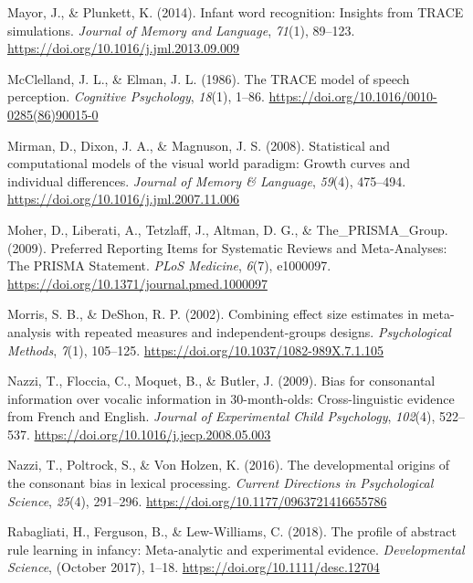 \documentclass[
  english,
  man, noextraspace]{apa6}
\newlength{\cslhangindent}
\newenvironment{cslreferences}%
  {\setlength{\parindent}{0pt}%
  \everypar{\setlength{\hangindent}{\cslhangindent}}\ignorespaces}%
  {\par}
\begin{document}
\begin{cslreferences}
\leavevmode\hypertarget{ref-Mayor2014}{}%
Mayor, J., \& Plunkett, K. (2014). Infant word recognition: Insights from TRACE simulations. \emph{Journal of Memory and Language}, \emph{71}(1), 89--123. \url{https://doi.org/10.1016/j.jml.2013.09.009}

\leavevmode\hypertarget{ref-McClelland1986}{}%
McClelland, J. L., \& Elman, J. L. (1986). The TRACE model of speech perception. \emph{Cognitive Psychology}, \emph{18}(1), 1--86. \url{https://doi.org/10.1016/0010-0285(86)90015-0}

\leavevmode\hypertarget{ref-Mirman2008}{}%
Mirman, D., Dixon, J. A., \& Magnuson, J. S. (2008). Statistical and computational models of the visual world paradigm: Growth curves and individual differences. \emph{Journal of Memory \& Language}, \emph{59}(4), 475--494. \url{https://doi.org/10.1016/j.jml.2007.11.006}

\leavevmode\hypertarget{ref-Moher2009}{}%
Moher, D., Liberati, A., Tetzlaff, J., Altman, D. G., \& The\_PRISMA\_Group. (2009). Preferred Reporting Items for Systematic Reviews and Meta-Analyses: The PRISMA Statement. \emph{PLoS Medicine}, \emph{6}(7), e1000097. \url{https://doi.org/10.1371/journal.pmed.1000097}

\leavevmode\hypertarget{ref-morris2002combining}{}%
Morris, S. B., \& DeShon, R. P. (2002). Combining effect size estimates in meta-analysis with repeated measures and independent-groups designs. \emph{Psychological Methods}, \emph{7}(1), 105--125. \url{https://doi.org/10.1037/1082-989X.7.1.105}

\leavevmode\hypertarget{ref-Nazzi2009a}{}%
Nazzi, T., Floccia, C., Moquet, B., \& Butler, J. (2009). Bias for consonantal information over vocalic information in 30-month-olds: Cross-linguistic evidence from French and English. \emph{Journal of Experimental Child Psychology}, \emph{102}(4), 522--537. \url{https://doi.org/10.1016/j.jecp.2008.05.003}

\leavevmode\hypertarget{ref-Nazzi2016}{}%
Nazzi, T., Poltrock, S., \& Von Holzen, K. (2016). The developmental origins of the consonant bias in lexical processing. \emph{Current Directions in Psychological Science}, \emph{25}(4), 291--296. \url{https://doi.org/10.1177/0963721416655786}

\leavevmode\hypertarget{ref-Rabagliati2018}{}%
Rabagliati, H., Ferguson, B., \& Lew-Williams, C. (2018). The profile of abstract rule learning in infancy: Meta-analytic and experimental evidence. \emph{Developmental Science}, (October 2017), 1--18. \url{https://doi.org/10.1111/desc.12704}


\end{cslreferences}
\end{document}
